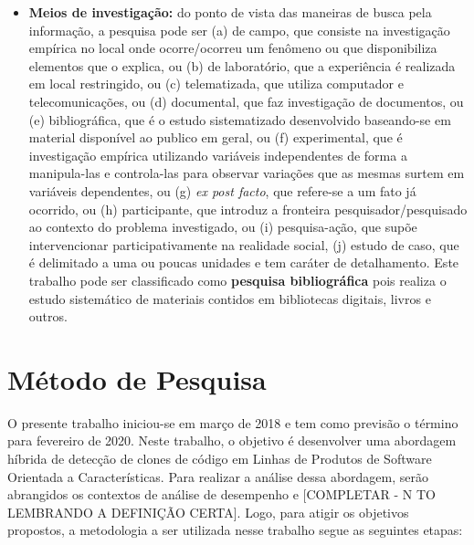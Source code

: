 \begin{itemize}
	\item \textbf{Meios de investigação:} do ponto de vista das maneiras de busca pela informação, a pesquisa pode ser (a) de campo, que consiste na investigação empírica no local onde ocorre/ocorreu um fenômeno ou que disponibiliza elementos que o explica, ou (b) de laboratório, que a experiência é realizada em local restringido, ou (c) telematizada, que utiliza computador e telecomunicações, ou (d) documental, que faz investigação de documentos, ou (e) bibliográfica, que é o estudo sistematizado desenvolvido baseando-se em material disponível ao publico em geral, ou (f) experimental, que é investigação empírica utilizando variáveis independentes de forma a manipula-las e controla-las para observar variações que as mesmas surtem em variáveis dependentes, ou (g) \textit{ex post facto}, que refere-se a um fato já ocorrido, ou (h) participante, que introduz a fronteira pesquisador/pesquisado ao contexto do problema investigado, ou (i) pesquisa-ação, que supõe intervencionar participativamente na realidade social, (j) estudo de caso, que é delimitado a uma ou poucas unidades e tem caráter de detalhamento. Este trabalho pode ser classificado como \textbf{pesquisa bibliográfica} pois realiza o estudo sistemático de materiais contidos em bibliotecas digitais, livros e outros.
	
\end{itemize}

\section{Método de Pesquisa}

O presente trabalho iniciou-se em março de 2018 e tem como previsão o término para fevereiro de 2020. Neste trabalho, o objetivo é desenvolver uma abordagem híbrida de detecção de clones de código em Linhas de Produtos de Software Orientada a Características. Para realizar a análise dessa abordagem, serão abrangidos os contextos de análise de desempenho e [COMPLETAR - N TO LEMBRANDO A DEFINIÇÃO CERTA]. Logo, para atigir os objetivos propostos, a metodologia a ser utilizada nesse trabalho segue as seguintes etapas:

